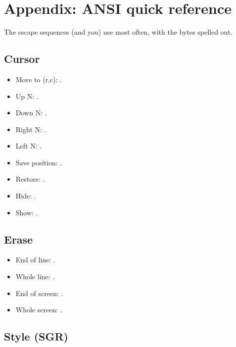 \chapter{Appendix: ANSI quick reference}
\label{ch:ansiref}

\begin{aside}
The escape sequences \maya{} (and you) use most often, with
the bytes spelled out.
\end{aside}

\section{Cursor}

\begin{itemize}[leftmargin=*]
  \item Move to (r,c): \code{ESC [ r ; c H}.
  \item Up N: \code{ESC [ N A}.
  \item Down N: \code{ESC [ N B}.
  \item Right N: \code{ESC [ N C}.
  \item Left N: \code{ESC [ N D}.
  \item Save position: .
  \item Restore: .
  \item Hide: \code{ESC [ ? 25 l}.
  \item Show: \code{ESC [ ? 25 h}.
\end{itemize}

\section{Erase}

\begin{itemize}[leftmargin=*]
  \item End of line: \code{ESC [ K}.
  \item Whole line: \code{ESC [ 2 K}.
  \item End of screen: \code{ESC [ J}.
  \item Whole screen: \code{ESC [ 2 J}.
\end{itemize}

\section{Style (SGR)}

